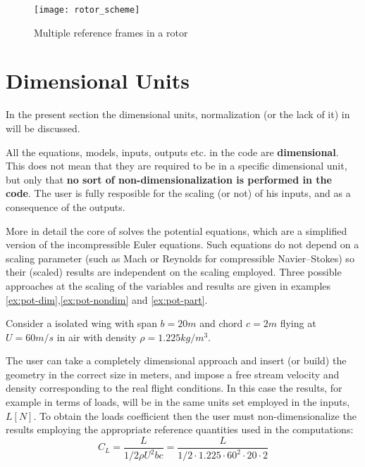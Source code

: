 \begin{figure}
\centering
\texttt{[image: rotor\_scheme]}
\caption{Multiple reference frames in a rotor}
\label{fig:multiple_refs}
\end{figure}

\section{Dimensional Units}
\label{sec:Dimensional_Units}

In the present section the dimensional units, normalization (or the lack of it) in \DUST{} will be discussed.

All the equations, models, inputs, outputs etc. in the code are \textbf{dimensional}. This does not mean that they are required to be in a specific dimensional unit, but only that \textbf{no sort of non-dimensionalization is performed in the code}. The user is fully resposible for the scaling (or not) of his inputs, and as a consequence of the outputs. 

More in detail the core of \DUST{} solves the potential equations, which are a simplified version of the incompressible Euler equations. Such equations do not depend on a scaling parameter (such as Mach or Reynolds for compressible Navier--Stokes) so their (scaled) results are independent on the scaling employed. Three possible approaches at the scaling of the variables and results are given in examples \ref{ex:pot-dim},\ref{ex:pot-nondim} and \ref{ex:pot-part}. 

\begin{example}
\label{ex:pot-dim}
Consider a isolated wing with span $b = 20 m$ and chord $c = 2 m$ flying at $U = 60 m/s$ in air with density $\rho = 1.225 kg/m^3$. 

The user can take a completely dimensional approach and insert (or build) the geometry in the correct size in meters, and impose a free stream velocity and density corresponding to the real flight conditions. In this case the results, for example in terms of loads, will be in the same units set employed in the inputs, $L [N]$. To obtain the loads coefficient then the user must non-dimensionalize the results employing the appropriate reference quantities used in the computations:
\begin{equation*}
    C_L = \frac{L}{1/2 \rho U^2 b c} = \frac{L}{1/2 \cdot 1.225  \cdot 60^2 \cdot 20 \cdot 2}
\end{equation*}
\end{example}

